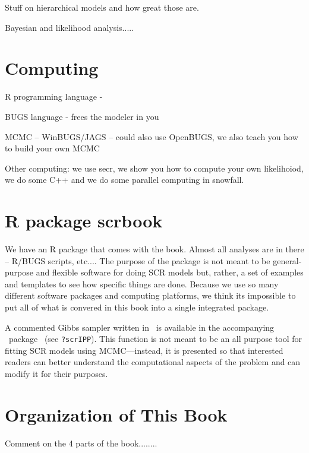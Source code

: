 Stuff on hierarchical models and how great those are.

Bayesian and likelihood analysis.....

\section{Computing}

R programming language  - 

BUGS language - frees the modeler in you

MCMC -- WinBUGS/JAGS -- could also use OpenBUGS, we also teach you how
to build your own MCMC

Other computing:  we use secr, we show you how to compute your own
likelihoiod, we do some C++ and we do some parallel computing in
snowfall. 

\section{R package scrbook}

We have an R package that comes with the book. Almost all analyses are
in there -- R/BUGS scripts, etc....
The purpose of the package is  not meant to be general-purpose and
flexible software for doing SCR models but, rather, a set of examples
and templates to see how specific things are done.   Because we use so
many different software packages and computing platforms, we think its
impossible to put all of what is convered in this book into a single
integrated package. 




  A commented Gibbs sampler written
in \R~is available in the accompanying \R~package \scrbook~(see
\texttt{?scrIPP}). This function is not meant to be an all purpose
tool for fitting SCR models using MCMC---instead, it is presented so
that interested readers can better understand the computational
aspects of the problem and can modify it for their purposes.



\section{Organization of This Book}

Comment on the 4 parts of the book........


